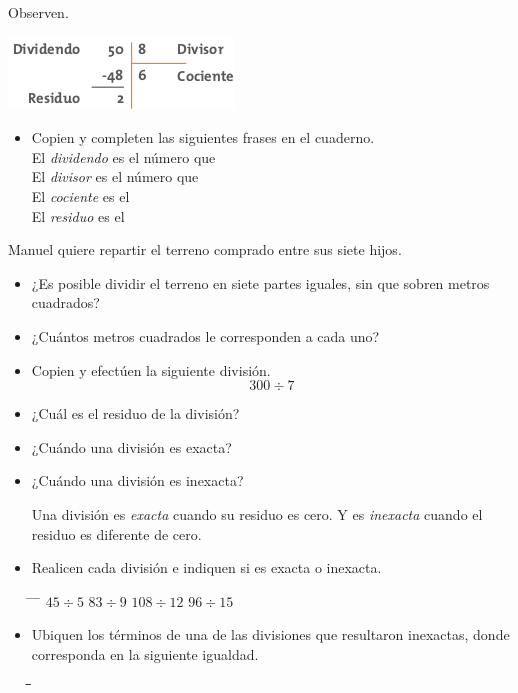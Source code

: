 \documentclass[letterpaper,11pt,twoside]{article}
\begin{document}
\begin{multicols}{2}
Observen.
\begin{center}
\includegraphics[scale=.75]{Images/dividendo.png} 
\end{center}
\begin{itemize}
\item Copien y completen las siguientes frases en el cuaderno.\\
El \emph{dividendo} es el número que \hrulefill\\
El \emph{divisor} es el número que \hrulefill\\
El \emph{cociente} es el \hrulefill\\
El \emph{residuo} es el \hrulefill
\end{itemize}
Manuel quiere repartir el terreno comprado entre sus siete hijos.
\begin{itemize}
\item ¿Es posible dividir el terreno en siete partes iguales, sin que sobren metros cuadrados?
\item ¿Cuántos metros cuadrados le corresponden a cada uno?
\item Copien y efectúen la siguiente división.
\[300\div7\]
\item ¿Cuál es el residuo de la división?
\item ¿Cuándo una división es exacta?
\item ¿Cuándo una división es inexacta?

Una división es \emph{exacta} cuando su residuo es cero. Y es \emph{inexacta} cuando el residuo es diferente de cero.
\item Realicen cada división e indiquen si es exacta o
inexacta.
\begin{tabbing}
\hspace{2cm} \= \hspace{2cm} \= \hspace{2cm} \= \kill
$45\div 5$ \> $83\div 9$ \> $108\div 12$ \> $96\div 15$ 
\end{tabbing}
\item Ubiquen los términos de una de las divisiones que resultaron inexactas, donde corresponda en la siguiente igualdad.
\begin{tabbing}
\hspace{20pt}\=\hspace{20pt}\=\hspace{20pt}\=\hspace{20pt}\=\kill
 \>  \>  \>  \> \\ 
 \>  \>  \>  \> 
\end{tabbing} 
\end{itemize}
\end{multicols}
\end{document}
